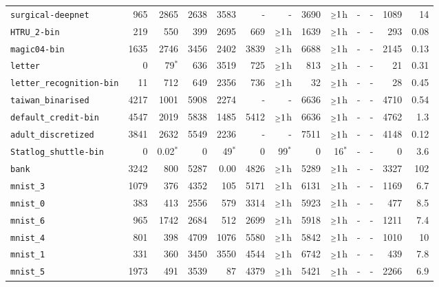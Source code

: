 \begin{tabular}{lrrrrrrrrrrrr}
\texttt{surgical-deepnet} & 965 & 2865 & 2638 & 3583 & - & - & 3690 & $\mathsmaller{\geq}1$h & - & - & 1089 & 14\\
\texttt{HTRU\_2-bin} & 219 & 550 & 399 & 2695 & 669 & $\mathsmaller{\geq}1$h & 1639 & $\mathsmaller{\geq}1$h & - & - & 293 & 0.08\\
\texttt{magic04-bin} & 1635 & 2746 & 3456 & 2402 & 3839 & $\mathsmaller{\geq}1$h & 6688 & $\mathsmaller{\geq}1$h & - & - & 2145 & 0.13\\
\texttt{letter} & 0 & 79$^*$ & 636 & 3519 & 725 & $\mathsmaller{\geq}1$h & 813 & $\mathsmaller{\geq}1$h & - & - & 21 & 0.31\\
\texttt{letter\_recognition-bin} & 11 & 712 & 649 & 2356 & 736 & $\mathsmaller{\geq}1$h & 32 & $\mathsmaller{\geq}1$h & - & - & 28 & 0.45\\
\texttt{taiwan\_binarised} & 4217 & 1001 & 5908 & 2274 & - & - & 6636 & $\mathsmaller{\geq}1$h & - & - & 4710 & 0.54\\
\texttt{default\_credit-bin} & 4547 & 2019 & 5838 & 1485 & 5412 & $\mathsmaller{\geq}1$h & 6636 & $\mathsmaller{\geq}1$h & - & - & 4762 & 1.3\\
\texttt{adult\_discretized} & 3841 & 2632 & 5549 & 2236 & - & - & 7511 & $\mathsmaller{\geq}1$h & - & - & 4148 & 0.12\\
\texttt{Statlog\_shuttle-bin} & 0 & 0.02$^*$ & 0 & 49$^*$ & 0 & 99$^*$ & 0 & 16$^*$ & - & - & 0 & 3.6\\
\texttt{bank} & 3242 & 800 & 5287 & 0.00 & 4826 & $\mathsmaller{\geq}1$h & 5289 & $\mathsmaller{\geq}1$h & - & - & 3327 & 102\\
\texttt{mnist\_3} & 1079 & 376 & 4352 & 105 & 5171 & $\mathsmaller{\geq}1$h & 6131 & $\mathsmaller{\geq}1$h & - & - & 1169 & 6.7\\
\texttt{mnist\_0} & 383 & 413 & 2556 & 579 & 3314 & $\mathsmaller{\geq}1$h & 5923 & $\mathsmaller{\geq}1$h & - & - & 477 & 8.5\\
\texttt{mnist\_6} & 965 & 1742 & 2684 & 512 & 2699 & $\mathsmaller{\geq}1$h & 5918 & $\mathsmaller{\geq}1$h & - & - & 1211 & 7.4\\
\texttt{mnist\_4} & 801 & 398 & 4709 & 1076 & 5580 & $\mathsmaller{\geq}1$h & 5842 & $\mathsmaller{\geq}1$h & - & - & 1010 & 10\\
\texttt{mnist\_1} & 331 & 360 & 3450 & 3550 & 4544 & $\mathsmaller{\geq}1$h & 6742 & $\mathsmaller{\geq}1$h & - & - & 439 & 7.8\\
\texttt{mnist\_5} & 1973 & 491 & 3539 & 87 & 4379 & $\mathsmaller{\geq}1$h & 5421 & $\mathsmaller{\geq}1$h & - & - & 2266 & 6.9\\

\end{tabular}

